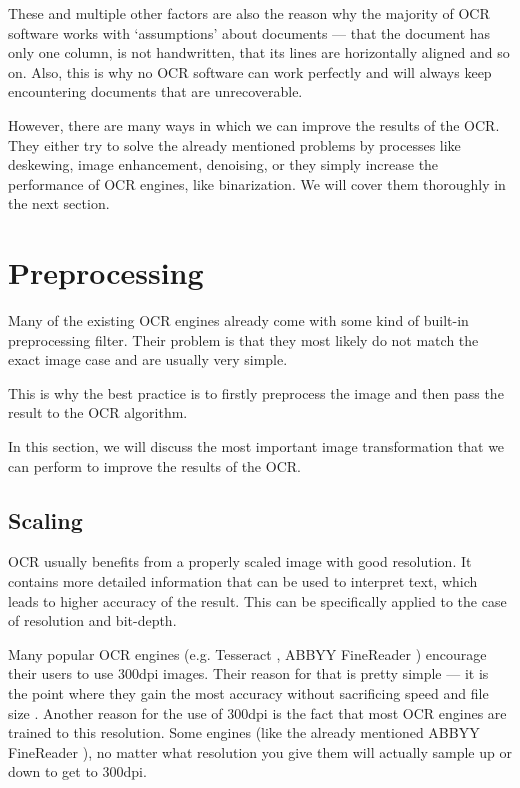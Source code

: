 These and multiple other factors are also the reason why the majority of OCR software works with `assumptions' about documents --- that the document has only one column, is not handwritten, that its lines are horizontally aligned and so on. Also, this is why no OCR software can work perfectly and will always keep encountering documents that are unrecoverable. 

However, there are many ways in which we can improve the results of the OCR. They either try to solve the already mentioned problems by processes like deskewing, image enhancement, denoising, or they simply increase the performance of OCR engines, like binarization. We will cover them thoroughly in the next section.

\section{Preprocessing}

Many of the existing OCR engines already come with some kind of built-in preprocessing filter. Their problem is that they most likely do not match the exact image case and are usually very simple.

This is why the best practice is to firstly preprocess the image and then pass the result to the OCR algorithm.

In this section, we will discuss the most important image transformation that we can perform to improve the results of the OCR. 

\subsection{Scaling}

OCR usually benefits from a properly scaled image with good resolution. It contains more detailed information that can be used to interpret text, which leads to higher accuracy of the result. This can be specifically applied to the case of resolution and bit-depth.

Many popular OCR engines (e.g. Tesseract \citep{TesseractQual}, ABBYY FineReader \citep{ABBYYdpi}) encourage their users to use 300dpi images. Their reason for that is pretty simple --- it is the point where they gain the most accuracy without sacrificing speed and file size \citep{preprocessAll}. Another reason for the use of 300dpi is the fact that most OCR engines are trained to this resolution. Some engines (like the already mentioned ABBYY FineReader \citep{ABBYYdpi}), no matter what resolution you give them will actually sample up or down to get to 300dpi. 


